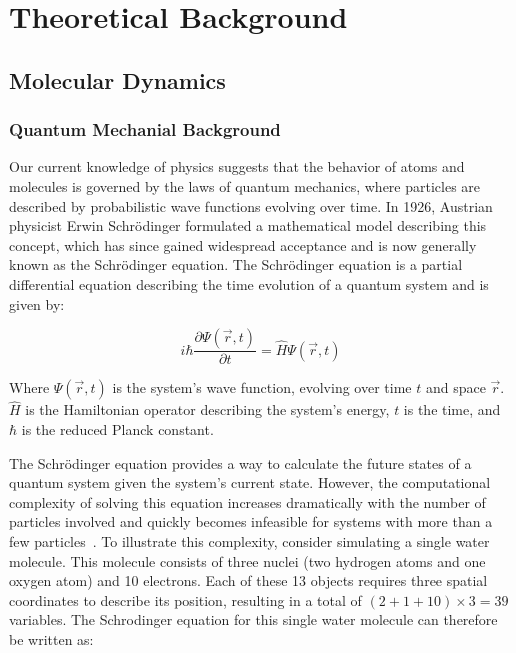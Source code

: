 \chapter{Theoretical Background}
\label{sec:theoretical_background}


\section{Molecular Dynamics}

\subsection{Quantum Mechanial Background}

Our current knowledge of physics suggests that the behavior of atoms and molecules is governed by the laws of quantum mechanics, where particles are described by probabilistic wave functions evolving over time. In 1926, Austrian physicist Erwin Schrödinger formulated a mathematical model describing this concept, which has since gained widespread acceptance and is now generally known as the Schrödinger equation. The Schrödinger equation is a partial differential equation describing the time evolution of a quantum system and is given by:

\begin{equation}
      i \hbar \frac{\partial \Psi(\vec{r}, t)}{\partial t} = \hat{H} \Psi(\vec{r}, t)
\end{equation}

Where $\Psi(\vec{r}, t)$ is the system's wave function, evolving over time $t$ and space $\vec{r}$. $\hat{H}$ is the Hamiltonian operator describing the system's energy, $t$ is the time, and $\hbar$ is the reduced Planck constant.
\smallskip

The Schrödinger equation provides a way to calculate the future states of a quantum system given the system's current state. However, the computational complexity of solving this equation increases dramatically with the number of particles involved and quickly becomes infeasible for systems with more than a few particles~\cite{Leimkuhler2015}. To illustrate this complexity, consider simulating a single water molecule. This molecule consists of three nuclei (two hydrogen atoms and one oxygen atom) and 10 electrons. Each of these 13 objects requires three spatial coordinates to describe its position, resulting in a total of $(2+1+10) \times 3 = 39$ variables. The Schrodinger equation for this single water molecule can therefore be written as:

